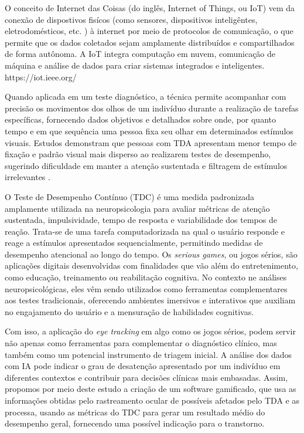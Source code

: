 O conceito de Internet das Coisas (do inglês, Internet of Things, ou IoT) vem da conexão de dispostivos fisícos (como sensores, dispositivos inteligêntes, eletrodomésticos, etc. ) à internet por meio de protocolos de comunicação, o que permite que os dados coletados sejam amplamente distribuídos e compartilhados de forma autônoma. A IoT integra computação em nuvem, comunicação de máquina e análise de dados para criar sistemas integrados e inteligentes. https://iot.ieee.org/
 
Quando aplicada em um teste diagnóstico, a técnica permite acompanhar com
precisão os movimentos dos olhos de um indivíduo durante a realização de tarefas
específicas, fornecendo dados objetivos e detalhados sobre onde, por quanto tempo e em
que sequência uma pessoa fixa seu olhar em determinados estímulos visuais. Estudos
demonstram que pessoas com TDA apresentam menor tempo de fixação e padrão visual
mais disperso ao realizarem testes de desempenho, sugerindo dificuldade em manter a
atenção sustentada e filtragem de estímulos irrelevantes \textcite{Lim2024}.

O Teste de Desempenho Contínuo (TDC) é uma medida padronizada amplamente
utilizada na neuropsicologia para avaliar métricas de atenção sustentada, impulsividade,
tempo de resposta e variabilidade dos tempos de reação. Trata-se de uma tarefa
computadorizada na qual o usuário responde e reage a estímulos apresentados
sequencialmente, permitindo medidas de desempenho atencional ao longo do tempo. Os
\textit{serious games}, ou jogos sérios, são aplicações digitais desenvolvidas com finalidades que
vão além do entretenimento, como educação, treinamento ou reabilitação cognitiva. No
contexto ne análises neuropsicológicas, eles vêm sendo utilizados como ferramentas
complementares aos testes tradicionais, oferecendo ambientes imersivos e interativos que
auxiliam no engajamento do usuário e a mensuração de habilidades cognitivas.

Com isso, a aplicação do \textit{eye tracking} em algo como os jogos sérios, podem servir não
apenas como ferramentas para complementar o diagnóstico clínico, mas também como um
potencial instrumento de triagem inicial. A análise dos dados com IA pode indicar o grau de
desatenção apresentado por um indivíduo em diferentes contextos e contribuir para decisões
clínicas mais embasadas. Assim, propomos por meio deste estudo a criação de um software
gamificado, que usa as informações obtidas pelo rastreamento ocular de possíveis afetados
pelo TDA e as processa, usando as métricas do TDC para gerar um resultado médio do
desempenho geral, fornecendo uma possível indicação para o transtorno.
